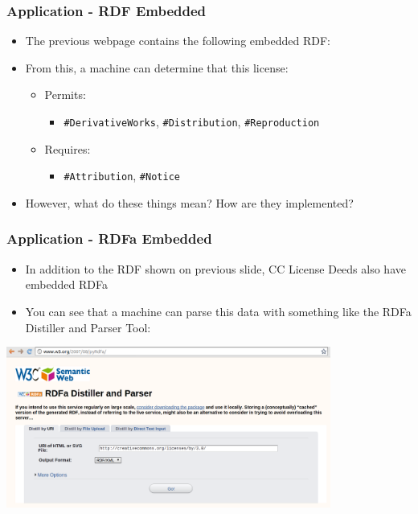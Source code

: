 \documentclass[t, xcolor=dvipsnames, handout, 10pt]{beamer}
\begin{document}
\begin{frame}[fragile]
\frametitle{Application - RDF Embedded}
        \begin{itemize}
            \item The previous webpage contains the following embedded RDF:
        \end{itemize}

        \begin{itemize}
            \item From this, a machine can determine that this license:
            \begin{itemize}
                \item Permits:
                    \begin{itemize}
                        \item \texttt{\#DerivativeWorks}, \texttt{\#Distribution}, \texttt{\#Reproduction}
                    \end{itemize}
                \item Requires:
                    \begin{itemize}
                        \item \texttt{\#Attribution}, \texttt{\#Notice}
                    \end{itemize}
            \end{itemize}
            \item However, what do these things mean?  How are they implemented?
        \end{itemize}
\end{frame}

\begin{frame}[t]
\frametitle{Application - RDFa Embedded}
        \begin{itemize}
            \item In addition to the RDF shown on previous slide, CC License Deeds also have embedded RDFa
            \item You can see that a machine can parse this data with something
            like the RDFa Distiller and Parser Tool:
        \end{itemize}
        \begin{center}
            \includegraphics[width=0.8\textwidth]{resources/RDF/RDFa-distiller.png}
        \end{center}
\end{frame}
\end{document}
